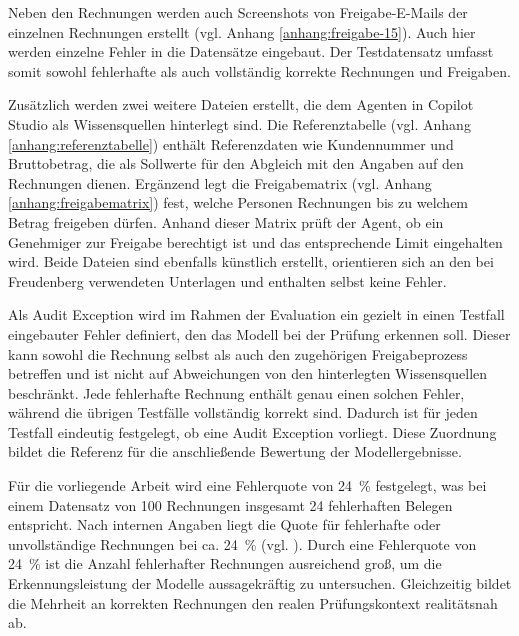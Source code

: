 Neben den Rechnungen werden auch Screenshots von Freigabe-E-Mails der einzelnen Rechnungen erstellt (vgl. Anhang \ref{anhang:freigabe-15}). Auch hier werden einzelne Fehler in die Datensätze eingebaut. Der Testdatensatz umfasst somit sowohl fehlerhafte als auch vollständig korrekte Rechnungen und Freigaben.

Zusätzlich werden zwei weitere Dateien erstellt, die dem Agenten in Copilot Studio als Wissensquellen hinterlegt sind. Die Referenztabelle (vgl. Anhang \ref{anhang:referenztabelle}) enthält Referenzdaten wie Kundennummer und Bruttobetrag, die als Sollwerte für den Abgleich mit den Angaben auf den Rechnungen dienen. Ergänzend legt die Freigabematrix (vgl. Anhang \ref{anhang:freigabematrix}) fest, welche Personen Rechnungen bis zu welchem Betrag freigeben dürfen. Anhand dieser Matrix prüft der Agent, ob ein Genehmiger zur Freigabe berechtigt ist und das entsprechende Limit eingehalten wird. Beide Dateien sind ebenfalls künstlich erstellt, orientieren sich an den bei Freudenberg verwendeten Unterlagen und enthalten selbst keine Fehler.

Als Audit Exception wird im Rahmen der Evaluation ein gezielt in einen Testfall eingebauter Fehler definiert, den das Modell bei der Prüfung erkennen soll. Dieser kann sowohl die Rechnung selbst als auch den zugehörigen Freigabeprozess betreffen und ist nicht auf Abweichungen von den hinterlegten Wissensquellen beschränkt. Jede fehlerhafte Rechnung enthält genau einen solchen Fehler, während die übrigen Testfälle vollständig korrekt sind. Dadurch ist für jeden Testfall eindeutig festgelegt, ob eine Audit Exception vorliegt. Diese Zuordnung bildet die Referenz für die anschließende Bewertung der Modellergebnisse.

Für die vorliegende Arbeit wird eine Fehlerquote von 24~\% festgelegt, was bei einem Datensatz von 100 Rechnungen insgesamt 24 fehlerhaften Belegen entspricht. Nach internen Angaben liegt die Quote für fehlerhafte oder unvollständige Rechnungen bei ca. 24~\% (vgl. \cite{Goth2026}). Durch eine Fehlerquote von 24~\% ist die Anzahl fehlerhafter Rechnungen ausreichend groß, um die Erkennungsleistung der Modelle aussagekräftig zu untersuchen. Gleichzeitig bildet die Mehrheit an korrekten Rechnungen den realen Prüfungskontext realitätsnah ab.

